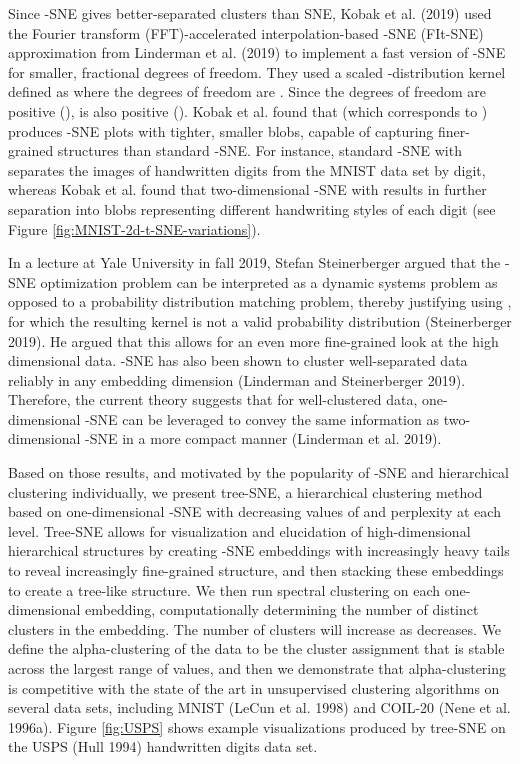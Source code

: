\documentclass{article}
\begin{document}
Since -SNE gives better-separated clusters than SNE, Kobak et al. (2019) used the Fourier transform (FFT)-accelerated interpolation-based -SNE (FIt-SNE) approximation from Linderman et al. (2019) to implement a fast version of -SNE for smaller, fractional degrees of freedom. They used a scaled -distribution kernel defined as  where the degrees of freedom are . Since the degrees of freedom are positive (),  is also positive (). Kobak et al. found that  (which corresponds to ) produces -SNE plots with tighter, smaller blobs, capable of capturing finer-grained structures than standard -SNE. For instance, standard -SNE with  separates the images of handwritten digits from the MNIST data set by digit, whereas Kobak et al. found that two-dimensional -SNE with  results in further separation into blobs representing different handwriting styles of each digit (see Figure \ref{fig:MNIST-2d-t-SNE-variations}).

In a lecture at Yale University in fall 2019, Stefan Steinerberger argued that the -SNE optimization problem can be interpreted as a dynamic systems problem as opposed to a probability distribution matching problem, thereby justifying using , for which the resulting kernel is not a valid probability distribution (Steinerberger 2019). He argued that this allows for an even more fine-grained look at the high dimensional data. -SNE has also been shown to cluster well-separated data reliably in any embedding dimension (Linderman and Steinerberger 2019). Therefore, the current theory suggests that for well-clustered data, one-dimensional -SNE can be leveraged to convey the same information as two-dimensional -SNE in a more compact manner (Linderman et al. 2019). 

Based on those results, and motivated by the popularity of -SNE and hierarchical clustering individually, we present tree-SNE, a hierarchical clustering method based on one-dimensional -SNE with decreasing values of  and perplexity at each level. Tree-SNE allows for visualization and elucidation of high-dimensional hierarchical structures by creating -SNE embeddings with increasingly heavy tails to reveal increasingly fine-grained structure, and then stacking these embeddings to create a tree-like structure. We then run spectral clustering on each one-dimensional embedding, computationally determining the number of distinct clusters in the embedding. The number of clusters will increase as  decreases. We define the alpha-clustering of the data to be the cluster assignment that is stable across the largest range of  values, and then we demonstrate that alpha-clustering is competitive with the state of the art in unsupervised clustering algorithms on several data sets, including MNIST (LeCun et al. 1998) and COIL-20 (Nene et al. 1996a). Figure \ref{fig:USPS} shows example visualizations produced by tree-SNE on the USPS (Hull 1994) handwritten digits data set. 
\end{document}
